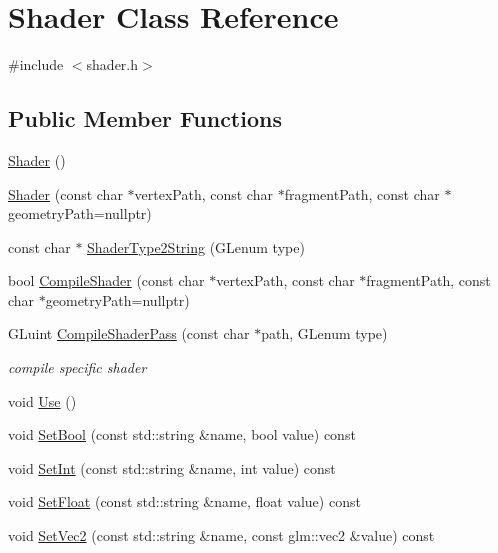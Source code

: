 \hypertarget{class_shader}{}\section{Shader Class Reference}
\label{class_shader}


{\ttfamily \#include $<$shader.\+h$>$}

\subsection*{Public Member Functions}
\begin{DoxyCompactItemize}
\item 
\mbox{\hyperlink{class_shader_a0d654ebaca4e0555197c0724c6d30610}{Shader}} ()
\item 
\mbox{\hyperlink{class_shader_aa732beb72038e86aca70a34c369a255e}{Shader}} (const char $\ast$vertex\+Path, const char $\ast$fragment\+Path, const char $\ast$geometry\+Path=nullptr)
\item 
const char $\ast$ \mbox{\hyperlink{class_shader_a36e9aa72c2db6f2a19b59b3ba56857a9}{Shader\+Type2\+String}} (G\+Lenum type)
\item 
bool \mbox{\hyperlink{class_shader_a9a0b2bef331054185418a7a56da32697}{Compile\+Shader}} (const char $\ast$vertex\+Path, const char $\ast$fragment\+Path, const char $\ast$geometry\+Path=nullptr)
\item 
G\+Luint \mbox{\hyperlink{class_shader_a3bca7990179d8def06caad688b58581c}{Compile\+Shader\+Pass}} (const char $\ast$path, G\+Lenum type)
\begin{DoxyCompactList}\small\item\em compile specific shader \end{DoxyCompactList}\item 
void \mbox{\hyperlink{class_shader_a6b11327cff651ffdb22988b6917b1650}{Use}} ()
\item 
void \mbox{\hyperlink{class_shader_a70cd07acf03715e4e927df1be5c5b5a0}{Set\+Bool}} (const std\+::string \&name, bool value) const
\item 
void \mbox{\hyperlink{class_shader_a645ef3753b1fc09a30dbb26f817d88e5}{Set\+Int}} (const std\+::string \&name, int value) const
\item 
void \mbox{\hyperlink{class_shader_ac20ee02a436e4baeb63dde08a0364574}{Set\+Float}} (const std\+::string \&name, float value) const
\item 
void \mbox{\hyperlink{class_shader_a80a8159b305cc1d89170c777fad8f027}{Set\+Vec2}} (const std\+::string \&name, const glm\+::vec2 \&value) const

\end{DoxyCompactItemize}
